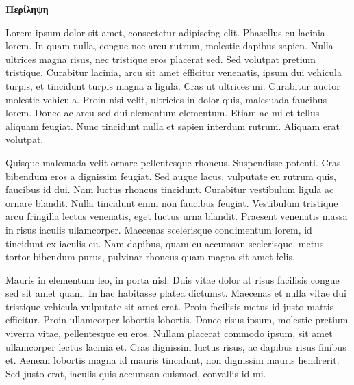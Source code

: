 \begin{center}
  \centering

  \vspace{0.5cm}
  \centering
  \textbf{\Large{Περίληψη}}

  \vspace{1cm}

\end{center}

Lorem ipsum dolor sit amet, consectetur adipiscing elit. Phasellus eu lacinia lorem. In quam nulla, congue nec arcu rutrum, molestie dapibus sapien. Nulla ultrices magna risus, nec tristique eros placerat sed. Sed volutpat pretium tristique. Curabitur lacinia, arcu sit amet efficitur venenatis, ipsum dui vehicula turpis, et tincidunt turpis magna a ligula. Cras ut ultrices mi. Curabitur auctor molestie vehicula. Proin nisi velit, ultricies in dolor quis, malesuada faucibus lorem. Donec ac arcu sed dui elementum elementum. Etiam ac mi et tellus aliquam feugiat. Nunc tincidunt nulla et sapien interdum rutrum. Aliquam erat volutpat.

Quisque malesuada velit ornare pellentesque rhoncus. Suspendisse potenti. Cras bibendum eros a dignissim feugiat. Sed augue lacus, vulputate eu rutrum quis, faucibus id dui. Nam luctus rhoncus tincidunt. Curabitur vestibulum ligula ac ornare blandit. Nulla tincidunt enim non faucibus feugiat. Vestibulum tristique arcu fringilla lectus venenatis, eget luctus urna blandit. Praesent venenatis massa in risus iaculis ullamcorper. Maecenas scelerisque condimentum lorem, id tincidunt ex iaculis eu. Nam dapibus, quam eu accumsan scelerisque, metus tortor bibendum purus, pulvinar rhoncus quam magna sit amet felis.

Mauris in elementum leo, in porta nisl. Duis vitae dolor at risus facilisis congue sed sit amet quam. In hac habitasse platea dictumst. Maecenas et nulla vitae dui tristique vehicula vulputate sit amet erat. Proin facilisis metus id justo mattis efficitur. Proin ullamcorper lobortis lobortis. Donec risus ipsum, molestie pretium viverra vitae, pellentesque eu eros. Nullam placerat commodo ipsum, sit amet ullamcorper lectus lacinia et. Cras dignissim luctus risus, ac dapibus risus finibus et. Aenean lobortis magna id mauris tincidunt, non dignissim mauris hendrerit. Sed justo erat, iaculis quis accumsan euismod, convallis id mi.
